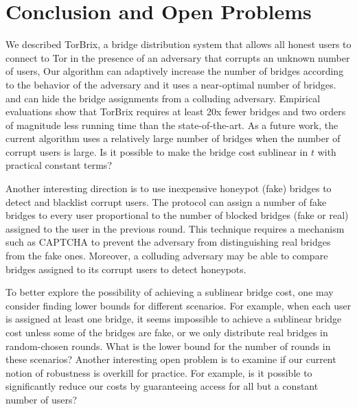 \documentclass{llncs}
\newcommand{\sfsize}{\fontsize{0.73\baselineskip}{0.73\baselineskip}\selectfont}
\newcommand{\sans}[1]{\textsf{\sfsize \mbox{#1}}}
\newcommand{\brix}{\sans{TorBrix}\xspace}
\begin{document}
\section{Conclusion and Open Problems} \label{sec:conclusion}
We described \brix, a bridge distribution system that allows all honest users to connect to Tor in the presence of an adversary that corrupts an unknown number of users, Our algorithm can adaptively increase the number of bridges according to the behavior of the adversary and it uses a near-optimal number of bridges. %
and can hide the bridge assignments from a colluding adversary. %
Empirical evaluations show that \brix requires at least 20x fewer bridges and two orders of magnitude less running time than the state-of-the-art.
%
As a future work, the current algorithm uses a relatively large number of bridges when the number of corrupt users is large. Is it possible to make the bridge cost sublinear in $t$ with practical constant terms? 

Another interesting direction is to use inexpensive honeypot (fake) bridges to detect and blacklist corrupt users. The protocol can assign a number of fake bridges to every user proportional to the number of blocked bridges (fake or real) assigned to the user in the previous round. This technique requires a mechanism such as CAPTCHA to prevent the adversary from distinguishing real bridges from the fake ones. Moreover, a colluding adversary may be able to compare bridges assigned to its corrupt users to detect honeypots.

To better explore the possibility of achieving a sublinear bridge cost, one may consider finding lower bounds for different scenarios. For example, when each user is assigned at least one bridge, it seems impossible to achieve a sublinear bridge cost unless some of the bridges are fake, or we only distribute real bridges in random-chosen rounds. What is the lower bound for the number of rounds in these scenarios?
Another interesting open problem is to examine if our current notion of robustness is overkill for practice. For example, is it possible to significantly reduce our costs by guaranteeing access for all but a constant number of users? %



\end{document}
